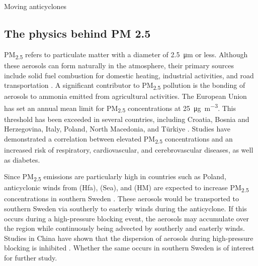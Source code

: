 Moving anticyclones

\subsection{The physics behind PM 2.5}
PM\textsubscript{2.5} refers to particulate matter with a diameter of \SI{2.5}{\micro\meter} or less. Although these aerosols can form naturally in the atmosphere, their primary sources include solid fuel combustion for domestic heating, industrial activities, and road transportation \cite{europeanenvironmentagencyEuropesAirQuality2024}. A significant contributor to PM\textsubscript{2.5} pollution is the bonding of aerosols to ammonia emitted from agricultural activities. The European Union has set an annual mean limit for PM\textsubscript{2.5} concentrations at \SI{25}{\micro\gram\per\cubic\meter}. This threshold has been exceeded in several countries, including Croatia, Bosnia and Herzegovina, Italy, Poland, North Macedonia, and Türkiye \cite{EuropesAirQuality2024}. Studies have demonstrated a correlation between elevated PM\textsubscript{2.5} concentrations and an increased risk of respiratory, cardiovascular, and cerebrovascular diseases, as well as diabetes.

Since PM\textsubscript{2.5} emissions are particularly high in countries such as Poland, anticyclonic winds from (Hfa), (Sea), and (HM) are expected to increase PM\textsubscript{2.5} concentrations in southern Sweden \cite{europeanenvironmentagencyEuropesAirQuality2024}. These aerosols would be transported to southern Sweden via southerly to easterly winds during the anticyclone. If this occurs during a high-pressure blocking event, the aerosols may accumulate over the region while continuously being advected by southerly and easterly winds. Studies in China have shown that the dispersion of aerosols during high-pressure blocking is inhibited \cite{caiImpactBlockingStructure2020}. Whether the same occurs in southern Sweden is of interest for further study.
